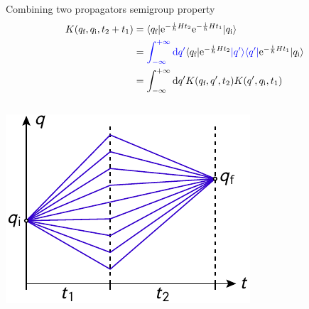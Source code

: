 \documentclass[t,dvipsnames]{beamer}
\begin{document}
\begin{frame}[c]{Combining two propagators}
 semigroup property
 \begin{displaymath}
  \begin{aligned}
   K(q_\text{f}, q_\text{i}, t_2+t_1) &= \langle q_\text{f}\vert
	  \text{e}^{-\frac{\text{i}}{\hbar}Ht_2}
	  \text{e}^{-\frac{\text{i}}{\hbar}Ht_1}\vert q_\text{i}\rangle\\
     &= \textcolor{blue}{\int_{-\infty}^{+\infty}\text{d}q'}\langle q_\text{f}\vert
	  \text{e}^{-\frac{\text{i}}{\hbar}Ht_2}\textcolor{blue}{\vert q'\rangle\langle q'\vert}
	  \text{e}^{-\frac{\text{i}}{\hbar}Ht_1}\vert q_\text{i}\rangle\\
     &= \int_{-\infty}^{+\infty}\text{d}q' K(q_\text{f}, q', t_2)K(q', q_\text{i}, t_1)
  \end{aligned}
 \end{displaymath}

 \begin{columns}
  \begin{column}[b]{0.4\textwidth}
   \includegraphics[width=\textwidth]{semigroup}
  \end{column}%
  \begin{column}[b]{0.6\textwidth}
   \begin{center}
   \end{center}

   \vspace{0.8truecm}
  \end{column}
 \end{columns}
\end{frame}
\end{document}
